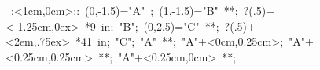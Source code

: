 %


\hbox{
\xy    <0cm,1cm>:<1cm,0cm>::
       (0,-1.5)="A" ; (1,-1.5)="B" **\dir{-};
            ?(.5)+<-1.25em,0ex> *\hbox{9 in}; "B";
       (0,2.5)="C" **\dir{-};
            ?(.5)+<2em,.75ex> *\hbox{41 in}; "C"; 
       "A" **\dir{-}; 
       "A"+<0cm,0.25cm>;  "A"+<0.25cm,0.25cm> **\dir{-};
       "A"+<0.25cm,0cm> **\dir{-};
       \endxy}
